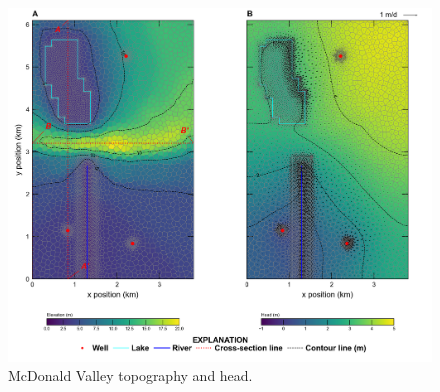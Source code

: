 \documentclass[11pt, oneside]{article}   	%
\begin{document}

\begin{figure}[ht!]
	\begin{center}
		\includegraphics{figures/mv_voronoi_map.png}
	\end{center}
	\caption{McDonald Valley topography and head.}
	\label{fig:mvmap}
\end{figure}

\end{document}
